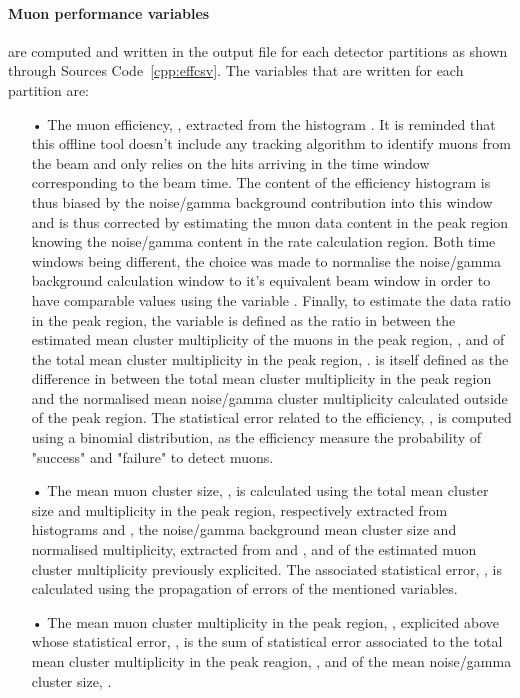 	\paragraph{Muon performance variables} are computed and written in the output file for each detector partitions as shown through Sources Code~\ref{cpp:effcsv}. The variables that are written for each partition are:
	
	\begin{itemize}
		\item[•] The muon efficiency, , extracted from the histogram . It is reminded that this offline tool doesn't include any tracking algorithm to identify muons from the beam and only relies on the hits arriving in the time window corresponding to the beam time. The content of the efficiency histogram is thus biased by the noise/gamma background contribution into this window and is thus corrected by estimating the muon data content in the peak region knowing the noise/gamma content in the rate calculation region. Both time windows being different, the choice was made to normalise the noise/gamma background calculation window to it's equivalent beam window in order to have comparable values using the variable . Finally, to estimate the data ratio in the peak region, the variable  is defined as the ratio in between the estimated mean cluster multiplicity of the muons in the peak region, , and of the total mean cluster multiplicity in the peak region, .  is itself defined as the difference in between the total mean cluster multiplicity in the peak region and the normalised mean noise/gamma cluster multiplicity calculated outside of the peak region. The statistical error related to the efficiency, , is computed using a binomial distribution, as the efficiency measure the probability of "success" and "failure" to detect muons.
		\item[•] The mean muon cluster size, , is calculated using the total mean cluster size and multiplicity in the peak region, respectively extracted from histograms  and , the noise/gamma background mean cluster size and normalised multiplicity, extracted from  and , and of the estimated muon cluster multiplicity  previously explicited. The associated statistical error, , is calculated using the propagation of errors of the mentioned variables.
		\item[•] The mean muon cluster multiplicity in the peak region, , explicited above whose statistical error, , is the sum of statistical error associated to the total mean cluster multiplicity in the peak reagion, , and of the mean noise/gamma cluster size, .
	\end{itemize}
	
